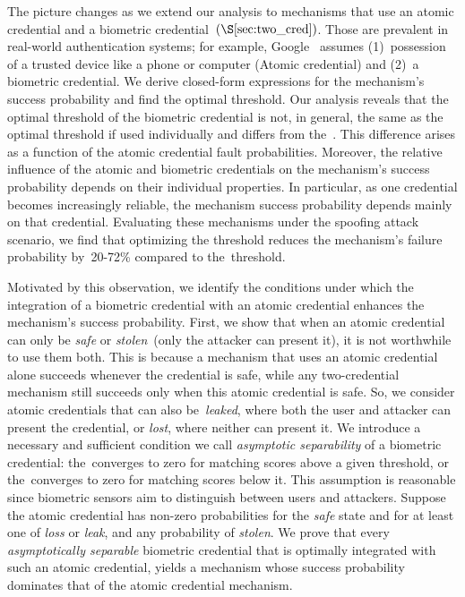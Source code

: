 \documentclass[conference,compsoc]{IEEEtran}
\begin{document}
The picture changes as we extend our analysis to mechanisms that use an atomic credential and a biometric credential~$(\S\ref{sec:two_cred})$. Those are prevalent in real-world authentication systems; for example, Google~\cite{google_passkeys_2023} assumes (1)~possession of a trusted device like a phone or computer (Atomic credential) and (2)~a biometric credential. We derive closed-form expressions for the mechanism's success probability and find the optimal threshold. Our analysis reveals that the optimal threshold of the biometric credential is not, in general, the same as the optimal threshold if used individually and differs from the~\EER. This difference arises as a function of the atomic credential fault probabilities. Moreover, the relative influence of the atomic and biometric credentials on the mechanism's success probability depends on their individual properties. In particular, as one credential becomes increasingly reliable, the mechanism success probability depends mainly on that credential. Evaluating these mechanisms under the spoofing attack scenario, we find that optimizing the threshold reduces the mechanism's failure probability by~20-72\% compared to the~\EER threshold. 

Motivated by this observation, we identify the conditions under which the integration of a biometric credential with an atomic credential enhances the mechanism's success probability. First, we show that when an atomic credential can only be \emph{safe} or \emph{stolen}~(only the attacker can present it), it is not worthwhile to use them both. This is because a mechanism that uses an atomic credential alone succeeds whenever the credential is safe, while any two-credential mechanism still succeeds only when this atomic credential is safe. So, we consider atomic credentials that can also be~\emph{leaked}, where both the user and attacker can present the credential, or \emph{lost}, where neither can present it. We introduce a necessary and sufficient condition we call \emph{asymptotic separability} of a biometric credential: the~\FAR converges to zero for matching scores above a given threshold, or the~\FRR converges to zero for matching scores below it. This assumption is reasonable since biometric sensors aim to distinguish between users and attackers. Suppose the atomic credential has non-zero probabilities for the \emph{safe} state and for at least one of \emph{loss} or \emph{leak}, and any probability of \emph{stolen}. We prove that every \emph{asymptotically separable} biometric credential that is optimally integrated with such an atomic credential, yields a mechanism whose success probability dominates that of the atomic credential mechanism.
\end{document}

